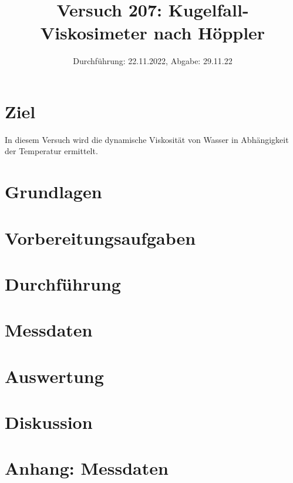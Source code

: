 

\title{Versuch 207: Kugelfall-Viskosimeter nach Höppler}
\date{Durchführung: 22.11.2022, Abgabe: 29.11.22}



\maketitle

\tableofcontents
\newpage

\section{Ziel}
In diesem Versuch wird die dynamische Viskosität von Wasser in Abhängigkeit der Temperatur ermittelt.

\section{Grundlagen}

\section{Vorbereitungsaufgaben}

\section{Durchführung}

\section{Messdaten}

\section{Auswertung}

\section{Diskussion}

\section*{Anhang: Messdaten}

